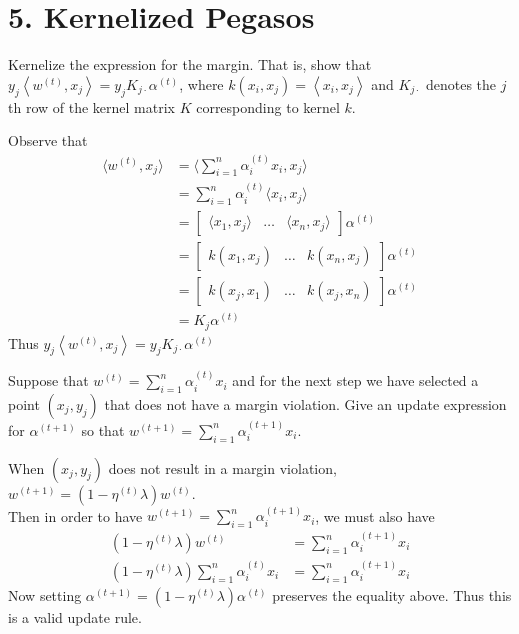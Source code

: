 \documentclass[12pt,letterpaper]{article}
\begin{document}
\section*{5. Kernelized Pegasos}
\begin{problem}{}
Kernelize the expression for the margin. That is, show that $y_{j}\left\langle w^{(t)},x_{j}\right\rangle =y_{j}K_{j\cdot}\alpha^{(t)}$,
where $k(x_{i},x_{j})=\left\langle x_{i},x_{j}\right\rangle $ and
$K_{j\cdot}$ denotes the $j$th row of the kernel matrix $K$ corresponding
to kernel $k$.
\end{problem}
\begin{solution}{}
    Observe that
    \begin{align*}
        \langle w^{(t)}, x_j \rangle &= \langle \sum_{i=1}^n \alpha_i^{(t)}x_i, x_j \rangle\\
        &= \sum_{i=1}^n \alpha_i^{(t)} \langle x_i, x_j \rangle\\
        &= \begin{bmatrix} \langle x_1, x_j \rangle & \dots & \langle x_n,x_j \rangle \end{bmatrix} \alpha^{(t)}\\
        &= \begin{bmatrix} k(x_1,x_j)  & \dots & k(x_n,x_j) \end{bmatrix} \alpha^{(t)}\\
        &= \begin{bmatrix} k(x_j,x_1)  & \dots & k(x_j,x_n) \end{bmatrix} \alpha^{(t)}\\
        &= K_j\alpha^{(t)}
    \end{align*}
    Thus $y_{j}\left\langle w^{(t)},x_{j}\right\rangle =y_{j}K_{j\cdot}\alpha^{(t)}$
\end{solution}
\newpage

\begin{problem}{5.2}
Suppose that $w^{(t)}=\sum_{i=1}^{n}\alpha_{i}^{(t)}x_{i}$ and for
the next step we have selected a point $\left(x_{j},y_{j}\right)$
that does not have a margin violation. Give an update expression for
$\alpha^{(t+1)}$ so that $w^{(t+1)}=\sum_{i=1}^{n}\alpha_{i}^{(t+1)}x_{i}$.
\end{problem}
\begin{solution}{}
    When $\left(x_{j},y_{j}\right)$ does not result in a margin violation, $w^{(t+1)} = (1-\eta^{(t)}\lambda)w^{(t)}$.\\ 
    Then in order to have $w^{(t+1)}=\sum_{i=1}^{n}\alpha_{i}^{(t+1)}x_{i}$, we must also have 
    \begin{align*}
        (1-\eta^{(t)}\lambda)w^{(t)} &= \sum_{i=1}^{n}\alpha_{i}^{(t+1)}x_{i}\\
        (1-\eta^{(t)}\lambda)\sum_{i=1}^{n}\alpha_{i}^{(t)}x_{i} &= \sum_{i=1}^{n}\alpha_{i}^{(t+1)}x_{i}
    \end{align*}
    Now setting $\alpha^{(t+1)} = (1-\eta^{(t)}\lambda)\alpha^{(t)}$ preserves the equality above. Thus this is a valid update rule.
\end{solution}
\newpage
\end{document}
